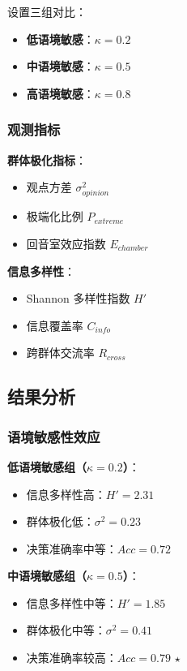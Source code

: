 \documentclass[a4paper,12pt]{article}
\begin{document}
设置三组对比：
\begin{itemize}
    \item \textbf{低语境敏感}：$\kappa = 0.2$
    \item \textbf{中语境敏感}：$\kappa = 0.5$
    \item \textbf{高语境敏感}：$\kappa = 0.8$
\end{itemize}

\subsubsection{观测指标}

\textbf{群体极化指标}：
\begin{itemize}
    \item 观点方差 $\sigma^2_{opinion}$
    \item 极端化比例 $P_{extreme}$
    \item 回音室效应指数 $E_{chamber}$
\end{itemize}

\textbf{信息多样性}：
\begin{itemize}
    \item Shannon 多样性指数 $H'$
    \item 信息覆盖率 $C_{info}$
    \item 跨群体交流率 $R_{cross}$
\end{itemize}

\subsection{结果分析}

\subsubsection{语境敏感性效应}

\textbf{低语境敏感组（$\kappa=0.2$）}：
\begin{itemize}
    \item 信息多样性高：$H' = 2.31$
    \item 群体极化低：$\sigma^2 = 0.23$
    \item 决策准确率中等：$Acc = 0.72$
\end{itemize}

\textbf{中语境敏感组（$\kappa=0.5$）}：
\begin{itemize}
    \item 信息多样性中等：$H' = 1.85$
    \item 群体极化中等：$\sigma^2 = 0.41$
    \item 决策准确率较高：$Acc = 0.79$ $\star$
\end{itemize}
\end{document}
